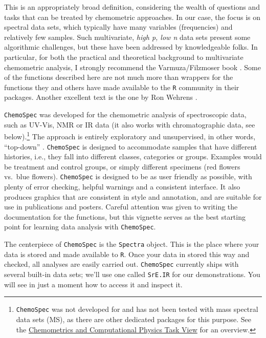 \documentclass[letter,10pt,twocolumn,twoside,printwatermark=false]{pinp}
\begin{document}
This is an appropriately broad definition, considering the wealth of
questions and tasks that can be treated by chemometric approaches. In
our case, the focus is on spectral data sets, which typically have many
variables (frequencies) and relatively few samples. Such multivariate,
\emph{high p, low n} data sets present some algorithmic challenges, but
these have been addressed by knowledgeable folks. In particular, for
both the practical and theoretical background to multivariate
chemometric analysis, I strongly recommend the Varmuza/Filzmoser book
\citep{Filz}. Some of the functions described here are not much more
than wrappers for the functions they and others have made available to
the \texttt{R} community in their packages. Another excellent text is
the one by Ron Wehrens \citep{Wehrens}.

\texttt{ChemoSpec} was developed for the chemometric analysis of
spectroscopic data, such as UV-Vis, NMR or IR data (it also works with
chromatographic data, see
below).\footnote{\texttt{ChemoSpec} was not developed for and has not been tested with mass spectral data sets (MS), as there are other dedicated packages for this purpose.  See the \href{http://cran.at.r-project.org/web/views/ChemPhys.html}{Chemometrics and Computational Physics Task View} for an overview.}
The approach is entirely exploratory and unsupervised, in other words,
``top-down'' \citep{Prog-Metabolomics}. \texttt{ChemoSpec} is designed
to accommodate samples that have different histories, i.e., they fall
into different classes, categories or groups. Examples would be
treatment and control groups, or simply different specimens (red flowers
vs.~blue flowers). \texttt{ChemoSpec} is designed to be as user friendly
as possible, with plenty of error checking, helpful warnings and a
consistent interface. It also produces graphics that are consistent in
style and annotation, and are suitable for use in publications and
posters. Careful attention was given to writing the documentation for
the functions, but this vignette serves as the best starting point for
learning data analysis with \texttt{ChemoSpec}.

The centerpiece of \texttt{ChemoSpec} is the \texttt{Spectra} object.
This is the place where your data is stored and made available to
\texttt{R}. Once your data in stored this way and checked, all analyses
are easily carried out. \texttt{ChemoSpec} currently ships with several
built-in data sets; we'll use one called \texttt{SrE.IR} for our
demonstrations. You will see in just a moment how to access it and
inspect it.
\end{document}
